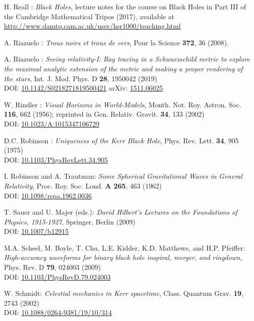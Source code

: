 \begin{thebibliography}{123}
H. Reall : {\em Black Holes}, lecture notes for the course on Black Holes in
Part III of the Cambridge Mathematical Tripos (2017), available at \\
\url{http://www.damtp.cam.ac.uk/user/hsr1000/teaching.html}

A. Riazuelo :
{\em Trous noirs et trous de vers},
Pour la Science {\bf 372}, 36 (2008).

A. Riazuelo :
{\em Seeing relativity-I: Ray tracing in a Schwarzschild metric to explore the maximal analytic extension of the metric and making a proper rendering of the stars},
Int. J. Mod. Phys. D {\bf 28}, 1950042 (2019)\\
DOI: \href{https://doi.org/10.1142/S0218271819500421}{10.1142/S0218271819500421}
\hfill
arXiv: \href{https://arxiv.org/abs/1511.06025}{1511.06025}

W. Rindler : {\em Visual Horizons in World-Models},
Month. Not. Roy. Astron. Soc. {\bf 116}, 662 (1956);
reprinted in Gen. Relativ. Gravit. {\bf 34}, 133 (2002)\\
DOI: \href{https://doi.org/10.1023/A:1015347106729}{10.1023/A:1015347106729}

D.C. Robinson : {\em Uniqueness of the Kerr Black Hole},
Phys. Rev. Lett. {\bf 34}, 905 (1975)\\
DOI: \href{https://doi.org/10.1103/PhysRevLett.34.905}{10.1103/PhysRevLett.34.905}

I. Robinson and A. Trautman: {\em Some Spherical Gravitational Waves in General Relativity},
Proc. Roy. Soc. Lond. {\bf A 265}, 463 (1962)\\
DOI: \href{https://doi.org/10.1098/rspa.1962.0036}{10.1098/rspa.1962.0036}

T. Sauer and U. Majer (eds.):
{\em David Hilbert’s Lectures on the Foundations of Physics, 1915-1927},
Springer, Berlin (2009)\\
DOI: \href{https://doi.org/10.1007/b12915}{10.1007/b12915}

M.A. Scheel, M. Boyle, T. Chu, L.E. Kidder, K.D. Matthews, and H.P. Pfeiffer:
{\em High-accuracy waveforms for binary black hole inspiral, merger, and ringdown},
Phys. Rev. D {\bf 79}, 024003 (2009)\\
DOI: \href{https://doi.org/10.1103/PhysRevD.79.024003}{10.1103/PhysRevD.79.024003}

W. Schmidt:
{\em Celestial mechanics in Kerr spacetime},
Class. Quantum Grav. {\bf 19}, 2743 (2002)\\
DOI: \href{https://doi.org/10.1088/0264-9381/19/10/314}{10.1088/0264-9381/19/10/314}


\end{thebibliography}
